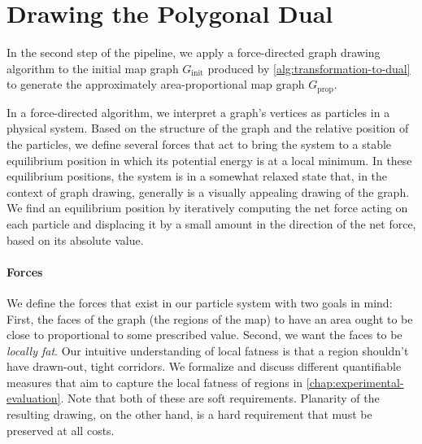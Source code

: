 \section{Drawing the Polygonal Dual}
\label{sect:drawing-the-dual}

In the second step of the pipeline, we apply a force-directed graph drawing algorithm to the initial map graph $G_\text{init}$ produced by \cref{alg:transformation-to-dual} to generate the approximately area-proportional map graph $G_\text{prop}$.

In a force-directed algorithm, we interpret a graph's vertices as particles in a physical system.
Based on the structure of the graph and the relative position of the particles, we define several forces that act to bring the system to a stable equilibrium position in which its potential energy is at a local minimum.
In these equilibrium positions, the system is in a somewhat relaxed state that, in the context of graph drawing, generally is a visually appealing drawing of the graph.
We find an equilibrium position by iteratively computing the net force acting on each particle and displacing it by a small amount in the direction of the net force, based on its absolute value.



\paragraph{Forces}

We define the forces that exist in our particle system with two goals in mind:
First, the faces of the graph (the regions of the map) to have an area ought to be close to proportional to some prescribed value.
Second, we want the faces to be \emph{locally fat}.
Our intuitive understanding of local fatness is that a region shouldn't have drawn-out, tight corridors.
We formalize and discuss different quantifiable measures that aim to capture the local fatness of regions in \cref{chap:experimental-evaluation}.
Note that both of these are soft requirements.
Planarity of the resulting drawing, on the other hand, is a hard requirement that must be preserved at all costs.

